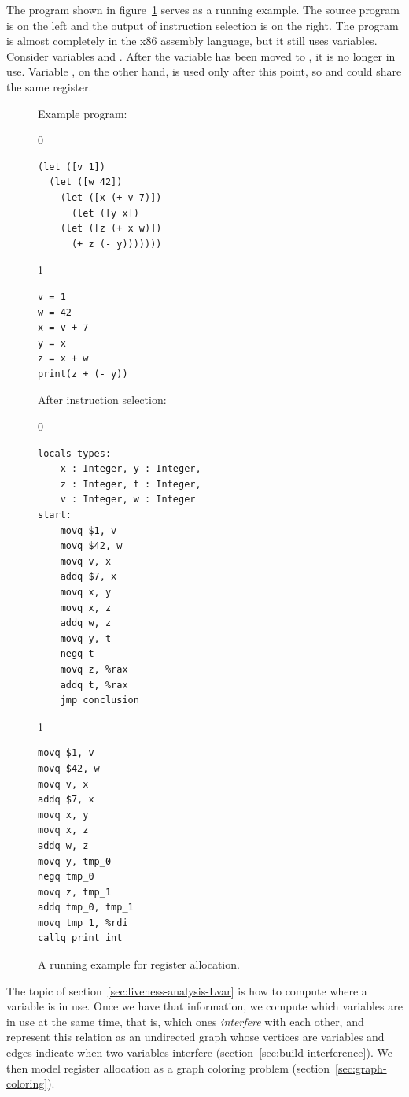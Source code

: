 \documentclass[7x10]{TimesAPriori_MIT}%
\def\racketEd{0}
\def\pythonEd{1}
\def\edition{1}
\newcommand{\pythonColor}[0]{}
\numberwithin{theorem}{chapter}
\numberwithin{definition}{chapter}
\numberwithin{equation}{chapter}
\begin{document}
The program shown in figure~\ref{fig:reg-eg} serves as a running
example. The source program is on the left and the output of
instruction selection
is on the right. The program is almost
completely in the x86 assembly language, but it still uses variables.
Consider variables  and .  After the variable 
has been moved to , it is no longer in use.  Variable , on
the other hand, is used only after this point, so  and
 could share the same register.

\begin{figure}
\begin{tcolorbox}[colback=white]
\begin{minipage}{0.45\textwidth}
Example \LangVar{} program:
{\if\edition\racketEd
\begin{lstlisting}
(let ([v 1])
  (let ([w 42])
    (let ([x (+ v 7)])
      (let ([y x])
	(let ([z (+ x w)])
	  (+ z (- y)))))))
\end{lstlisting}
\fi}
{\if\edition\pythonEd\pythonColor
\begin{lstlisting}
v = 1
w = 42
x = v + 7
y = x
z = x + w
print(z + (- y))
\end{lstlisting}
\fi}
\end{minipage}
\begin{minipage}{0.45\textwidth}
After instruction selection:
{\if\edition\racketEd
\begin{lstlisting}
locals-types:
    x : Integer, y : Integer,
    z : Integer, t : Integer,
    v : Integer, w : Integer
start:
    movq $1, v
    movq $42, w
    movq v, x
    addq $7, x
    movq x, y
    movq x, z
    addq w, z
    movq y, t
    negq t
    movq z, %rax
    addq t, %rax
    jmp conclusion
\end{lstlisting}
\fi}
{\if\edition\pythonEd\pythonColor
\begin{lstlisting}
movq $1, v
movq $42, w
movq v, x
addq $7, x
movq x, y
movq x, z
addq w, z
movq y, tmp_0
negq tmp_0
movq z, tmp_1
addq tmp_0, tmp_1
movq tmp_1, %rdi
callq print_int
\end{lstlisting}
\fi}
\end{minipage}
\end{tcolorbox}
\caption{A running example for register allocation.}
\label{fig:reg-eg}
\end{figure}

The topic of section~\ref{sec:liveness-analysis-Lvar} is how to
compute where a variable is in use.  Once we have that information, we
compute which variables are in use at the same time, that is, which ones
\emph{interfere} with each other, and
represent this relation as an undirected graph whose vertices are
variables and edges indicate when two variables interfere
(section~\ref{sec:build-interference}). We then model register
allocation as a graph coloring problem
(section~\ref{sec:graph-coloring}).
\end{document}
